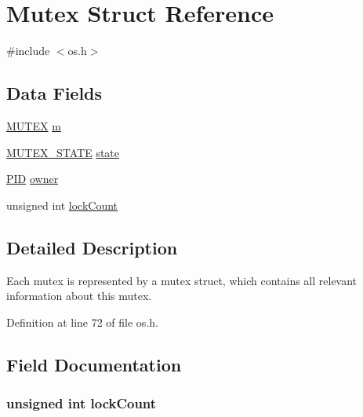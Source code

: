 \hypertarget{struct_mutex}{}\section{Mutex Struct Reference}
\label{struct_mutex}


{\ttfamily \#include $<$os.\+h$>$}

\subsection*{Data Fields}
\begin{DoxyCompactItemize}
\item 
\hyperlink{os_8h_ad50a579691fc8233e549f1b355ef96b3}{M\+U\+T\+EX} \hyperlink{struct_mutex_a83f1cf80c5086c88b4faec56356500d8}{m}
\item 
\hyperlink{os_8h_a19387686da7b8715f31f6d5a9eb8751e}{M\+U\+T\+E\+X\+\_\+\+S\+T\+A\+TE} \hyperlink{struct_mutex_a4c56d800948d078e891a4e1f0da9ce67}{state}
\item 
\hyperlink{os_8h_aa4f4d03691545cda70a42801c8b9096b}{P\+ID} \hyperlink{struct_mutex_a90934363cb9928058e05ccf79e6019a7}{owner}
\item 
unsigned int \hyperlink{struct_mutex_a715db135e857c8eab3494ebbab54ce2b}{lock\+Count}
\end{DoxyCompactItemize}


\subsection{Detailed Description}
Each mutex is represented by a mutex struct, which contains all relevant information about this mutex. 

Definition at line 72 of file os.\+h.



\subsection{Field Documentation}
\subsubsection[{\texorpdfstring{lock\+Count}{lockCount}}]{\setlength{\rightskip}{0pt plus 5cm}unsigned int lock\+Count}\hypertarget{struct_mutex_a715db135e857c8eab3494ebbab54ce2b}{}\label{struct_mutex_a715db135e857c8eab3494ebbab54ce2b}


